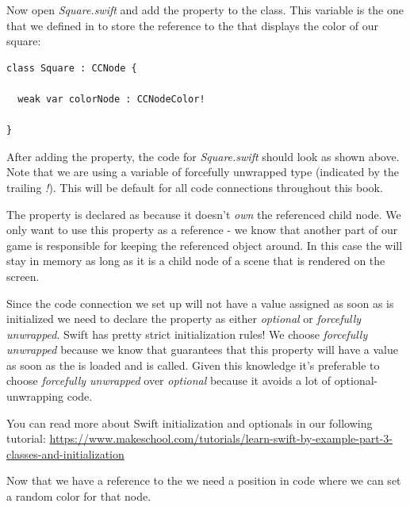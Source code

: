 \begin{leftbar}
Now open \textit{Square.swift} and add the property
 to the  class. This variable is the
one that we defined in \SB{} to store the reference to the
 that displays the color of our square:
\begin{lstlisting}
class Square : CCNode {
  
  weak var colorNode : CCNodeColor!
  
}
\end{lstlisting}
\end{leftbar}

After adding the property, the code for \textit{Square.swift} should look as
shown above. Note that we are using a  variable of forcefully
unwrapped type (indicated by the trailing \textit{!}). This will be default for
all code connections throughout this book.

The property is declared as  because it doesn't \textit{own}
the referenced child node. We only want to use this property as a reference - we
know that another part of our game is responsible for keeping the referenced
object around. In this case the  will stay in memory as
long as it is a child node of a scene that is rendered on the screen.

Since the code connection we set up will not have a value assigned as soon as
 is initialized we need to declare the property as either
\textit{optional} or \textit{forcefully unwrapped}. Swift has pretty strict
initialization rules! We choose \textit{forcefully unwrapped} because we know that
\cocos{} guarantees that this property will have a value as soon as the
\ccbfile{} is loaded and  is called. Given this
knowledge it's preferable to choose \textit{forcefully unwrapped} over
\textit{optional} because it avoids a lot of optional-unwrapping code.

\begin{details}
You can read more about Swift initialization and optionals in our following
tutorial:
\url{https://www.makeschool.com/tutorials/learn-swift-by-example-part-3-classes-and-initialization}
\end{details}

Now that we have a reference to the  we
need a position in code where we can set a random color for that node.

